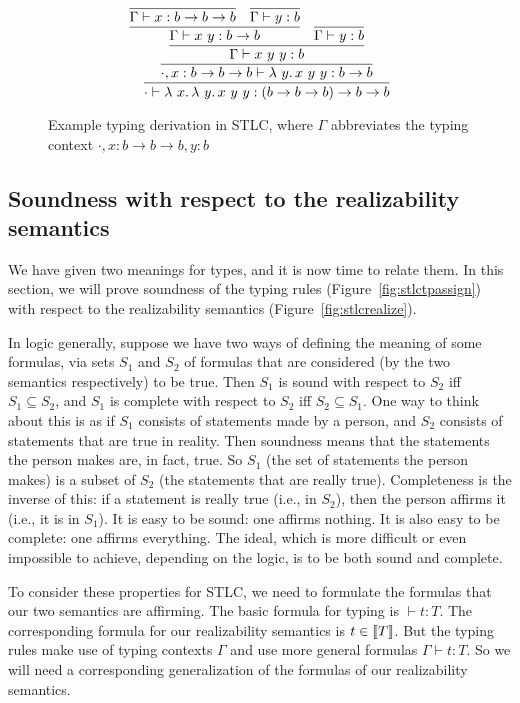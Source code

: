 \begin{figure}
  \[
  \infer{\cdot \vdash \lam{x}{\lam{y}{x\ y\ y}} : (b \to b \to b) \to b \to b}
        {\infer{\cdot,x:b \to b \to b \vdash \lam{y}{x\ y\ y} : b \to b}
          {\infer{\Gamma \vdash x\ y\ y : b}
            {\infer{\Gamma \vdash x\ y : b \to b}
              {\infer{\Gamma \vdash x : b \to b \to b}{\ }
              & \infer{\Gamma \vdash y : b}{\ }}
            &\infer{\Gamma \vdash y : b}{\ }}}}
  \]
\caption{Example typing derivation in STLC, where $\Gamma$ abbreviates the typing context $\cdot,x:b \to b \to b, y : b$}
\label{fig:stlcex}
\end{figure}

\subsection{Soundness with respect to the realizability semantics}

We have given two meanings for types, and it is now time to relate
them.  In this section, we will prove soundness of the typing rules
(Figure~\ref{fig:stlctpassign}) with respect to the realizability
semantics (Figure~\ref{fig:stlcrealize}).

In logic generally, suppose we have two ways of defining the meaning
of some formulas, via sets $S_1$ and $S_2$ of formulas that are
considered (by the two semantics respectively) to be true.  Then $S_1$
is sound with respect to $S_2$ iff $S_1 \subseteq S_2$, and $S_1$ is
complete with respect to $S_2$ iff $S_2 \subseteq
S_1$. One way to think about this is as
if $S_1$ consists of statements made by a person, and $S_2$ consists
of statements that are true in reality.  Then soundness means that the
statements the person makes are, in fact, true.  So $S_1$ (the set of
statements the person makes) is a subset of $S_2$ (the statements that
are really true).  Completeness is the inverse of this: if a statement
is really true (i.e., in $S_2$), then the person affirms it (i.e., it
is in $S_1$).  It is easy to be sound: one affirms nothing.  It is
also easy to be complete: one affirms everything.  The ideal, which is
more difficult or even impossible to achieve, depending on the logic,
is to be both sound and complete.

To consider these properties for STLC, we need to formulate the
formulas that our two semantics are affirming.  The basic formula for
typing is $\vdash t : T$.  The corresponding formula for our
realizability semantics is $t \in \llbracket T \rrbracket$.  But the typing rules
make use of typing contexts $\Gamma$ and use more general formulas
$\Gamma \vdash t : T$.  So we will need a corresponding generalization
of the formulas of our realizability semantics.

